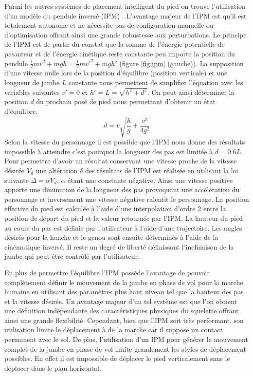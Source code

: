 \documentclass[runningheads,a4paper]{llncs}
\begin{document}
Parmi les autres systèmes de placement intelligent du pied on trouve l'utilisation d'un modèle du pendule inversé (IPM) \cite{coros2010generalized,kajita20013d}. L'avantage majeur de l'IPM est qu'il est totalement autonome et ne nécessite pas de configuration manuelle ou d'optimisation offrant ainsi une grande robustesse aux perturbations. Le principe de l'IPM est de partir du constat que la somme de l'énergie potentielle de pesanteur et de l'énergie cinétique reste constante peu importe la position du pendule  $\frac{1}{2}mv^2+mgh=\frac{1}{2}mv'^2+mgh'$ (figure \ref{fig:ipm} (gauche)). La supposition d'une vitesse nulle lors de la position d'équilibre (position verticale) et une longueur de jambe $L$ constante nous permettent de simplifier l'équation avec les variables suivantes \(v'=0\) et \(h'=L=\sqrt{h^2+d^2}\). On peut ainsi déterminer la position \(d\) du prochain posé de pied nous permettant d'obtenir un état d'équilibre.
\[
d=v\sqrt{\frac{h}{g}+\frac{v^2}{4g^2}}
\]
Selon la vitesse du personnage il est possible que l'IPM nous donne des résultats impossible à atteindre c'est pourquoi la longueur des pas est limitée à \(d=0.6L\).
Pour permettre d'avoir un résultat conservant une vitesse proche de la vitesse désirée \(V_d\) une altération $\delta$ des résultats de l'IPM est réalisée en utilisant la loi suivante \(\Delta=\alpha V_d\), $\alpha$ étant une constante négative. Ainsi une vitesse positive apporte une diminution de la longueur des pas provoquant une accélération du personnage et inversement une vitesse négative ralentit le personnage.
La position effective du pied est calculée à l'aide d'une interpolation d'ordre 2 entre la position de départ du pied et la valeur retournée par l'IPM. La hauteur du pied au cours du pas est définie par l'utilisateur à l'aide d'une trajectoire. Les angles désirés pour la hanche et le genou sont ensuite déterminés à l'aide de la cinématique inversé. Il reste un degré de liberté définissant l'inclinaison de la jambe qui peut être contrôlé par l'utilisateur.

En plus de permettre l'équilibre l'IPM possède l'avantage de pouvoir complètement définir le mouvement de la jambe en phase de vol pour la marche humaine en utilisant des paramètres plus haut niveau tel que la hauteur des pas et la vitesse désirée. Un avantage majeur d'un tel système est que l'on obtient une définition indépendante des caractéristiques physiques du squelette offrant ainsi une grande flexibilité. Cependant, bien que l'IPM soit très performant, son utilisation limite le déplacement à de la marche car il suppose un contact permanent avec le sol. De plus, l'utilisation d'un IPM pour générer le mouvement complet de la jambe en phase de vol limite grandement les styles de déplacement possibles. En effet il est impossible de déplacer le pied verticalement sans le déplacer dans le plan horizontal.
\end{document}
